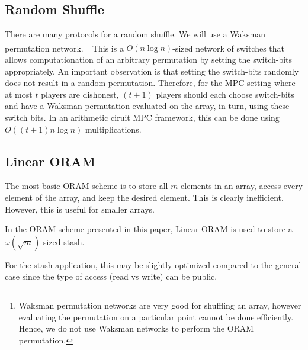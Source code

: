 \subsection{Random Shuffle}

There are many protocols for a random shuffle.
We will use a Waksman permutation network.
\footnote{Waksman permutation networks are very good for shuffling an array,
however evaluating the permutation on a particular point cannot be done
efficiently. Hence, we do not use Waksman networks to perform the ORAM permutation.}
This is a $O(n \log{n})$-sized network of switches that allows computationation
of an arbitrary permutation by setting the switch-bits appropriately.
An important observation is that setting the switch-bits randomly
does not result in a random permutation.
Therefore, for the MPC setting where at most $t$ players are dishonest,
$(t+1)$ players should each choose switch-bits and have a Waksman permutation
evaluated on the array, in turn, using these switch bits.  
In an arithmetic ciruit MPC framework, this can be done using $O( (t+1) n \log{n})$ multiplications.

\subsection{Linear ORAM}

The most basic ORAM scheme is to store all $m$ elements in an array,
access every element of the array, and keep the desired element.
This is clearly inefficient.
However, this is useful for smaller arrays.

In the ORAM scheme presented in this paper, Linear ORAM
is used to store a $\omega(\sqrt{m})$ sized stash.

For the stash application, this may be slightly optimized compared to the 
general case since the type of access (read vs write) can be public.

